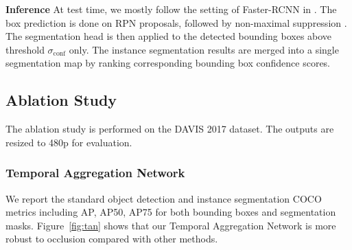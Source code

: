 \documentclass[10pt,twocolumn,letterpaper]{article}
\begin{document}
\textbf{Inference}
At test time, we mostly follow the setting of Faster-RCNN in \cite{lin2017fpn}.
The box prediction is done on RPN proposals,
followed by non-maximal suppression \cite{ross2010dpm}.
The segmentation head is then applied to the detected bounding boxes above threshold $\sigma_{\text{conf}}$ only.
The instance segmentation results are merged into a single segmentation map by  ranking  corresponding bounding box confidence scores.

\subsection{Ablation Study}
The ablation study is performed on the DAVIS 2017 dataset.
The outputs are resized to 480p for evaluation.

\vspace{-15pt}
\subsubsection{Temporal Aggregation Network}
\vspace{-5pt}

We report the standard object detection and instance segmentation COCO metrics including AP, AP50, AP75 for both bounding boxes and segmentation masks. Figure~\ref{fig:tan} shows that our Temporal Aggregation Network is more robust to occlusion compared with other methods.

\begin{table}[]
  \small
    \centering
    \addtolength{\tabcolsep}{-5pt}
\caption{Results of Temporal Aggregation Network (TAN) on DAVIS validation set.
This table presents results under different input resolutions when comparing with the baseline (i.e. no TAN).}
\vspace{-1em}
\label{table:ablation-tan-davis}
\end{table}
\end{document}
